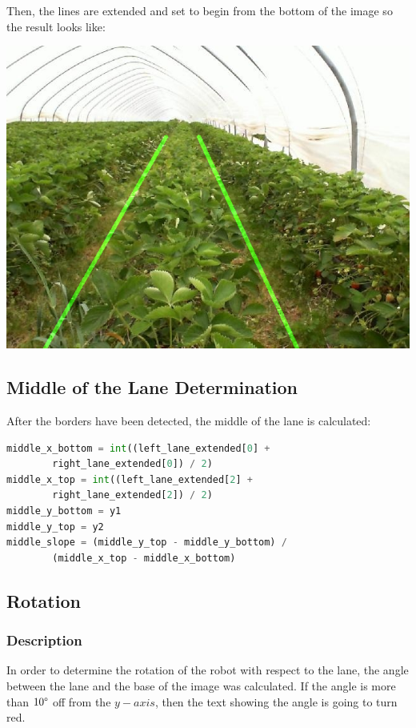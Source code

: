 \documentclass[12pt]{article}
\begin{document}
Then, the lines are extended and set to begin from the bottom of the image so the result looks like:
\begin{center}
\includegraphics[width=1.0\textwidth]{Bilder/result}
\end{center}


\subsection{Middle of the Lane Determination}
After the borders have been detected, the middle of the lane is calculated:
\begin{lstlisting}[language=Python]
middle_x_bottom = int((left_lane_extended[0] + 
		right_lane_extended[0]) / 2)
middle_x_top = int((left_lane_extended[2] + 
		right_lane_extended[2]) / 2)
middle_y_bottom = y1
middle_y_top = y2
middle_slope = (middle_y_top - middle_y_bottom) / 
		(middle_x_top - middle_x_bottom)
\end{lstlisting}

\subsection{Rotation}
\subsubsection*{Description}
In order to determine the rotation of the robot with respect to the lane, the angle between the lane and the base of the image was calculated. If the angle is more than $10\degree$ off from the $y-axis$, then the text showing the angle is going to turn red. 
\end{document}
